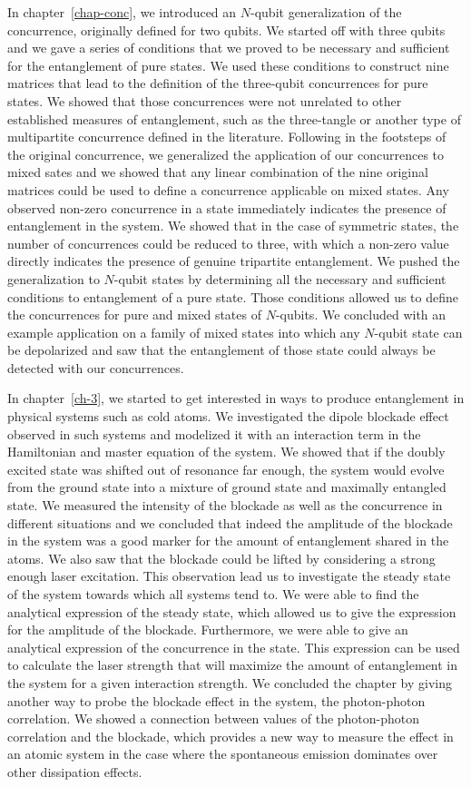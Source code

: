 In chapter~\ref{chap-conc}, we introduced an $N$-qubit generalization of the concurrence, originally defined for two qubits. We started off with three qubits and we gave a series of conditions that we proved to be necessary and sufficient for the entanglement of pure states. We used these conditions to construct nine matrices that lead to the definition of the three-qubit concurrences for pure states. We showed that those concurrences were not unrelated to other established measures of entanglement, such as the three-tangle or another type of multipartite concurrence defined in the literature. Following in the footsteps of the original concurrence, we generalized the application of our concurrences to mixed sates and we showed that any linear combination of the nine original matrices could be used to define a concurrence applicable on mixed states. Any observed non-zero concurrence in a state immediately indicates the presence of entanglement in the system. We showed that in the case of symmetric states, the number of concurrences could be reduced to three, with which a non-zero value  directly indicates the presence of genuine tripartite entanglement. We pushed the generalization to $N$-qubit states by determining all the necessary and sufficient conditions to entanglement of a pure state. Those conditions allowed us to define the concurrences for pure and mixed states of $N$-qubits. We concluded with an example application on a family of mixed states into which any $N$-qubit state can be depolarized and saw that the entanglement of those state could always be detected with our concurrences.

In chapter~\ref{ch-3}, we started to get interested in ways to produce entanglement in physical systems such as cold atoms. We investigated the dipole blockade effect observed in such systems and modelized it with an interaction term in the Hamiltonian and master equation of the system. We showed that if the doubly excited state was shifted out of resonance far enough, the system would evolve from the ground state into a mixture of ground state and maximally entangled state. We measured the intensity of the blockade as well as the concurrence in different situations and we concluded that indeed the amplitude of the blockade in the system was a good marker for the amount of entanglement shared in the atoms. We also saw that the blockade could be lifted by considering a strong enough laser excitation. This observation lead us to investigate the steady state of the system towards which all  systems tend to. We were able to find the analytical expression of the steady state, which allowed us to give the expression for the amplitude of the blockade. Furthermore, we were able to give an analytical expression of the concurrence in the state. This expression can be used to calculate the laser strength that will maximize the amount of entanglement in the system for a given interaction strength. We concluded the chapter by giving another way to probe the blockade effect in the system, the photon-photon correlation. We showed a connection between values of the photon-photon correlation and the blockade, which provides a new way to measure the effect in an atomic system in the case where the spontaneous emission dominates over other dissipation effects.

